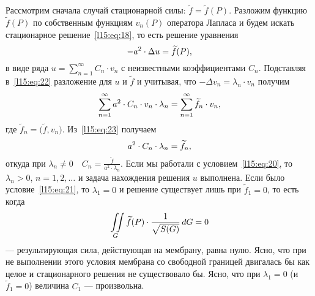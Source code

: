 \documentclass[12pt,a4paper,openany,fleqn]{book}
\theoremstyle{definition}
\begin{document}
	Рассмотрим сначала случай стационарной силы: $\widetilde{f}=\widetilde{f}(P)$. Разложим функцию $\widetilde{f}(P)$ по собственным функциям $v_n(P)$ оператора Лапласа и будем искать стационарное решение~\eqref{l15:eq:18}, то есть решение уравнения
	\begin{equation}\label{l15:eq:22}
		\hfill-a^2\cdot\Delta u=\widetilde{f}(P),\hfill
	\end{equation}
	в виде ряда $\displaystyle u=\sum\limits_{n=1}^{\infty}C_n\cdot v_n$ с неизвестными коэффициентами $C_n$. Подставляя в~\eqref{l15:eq:22} разложение для $u$ и $\widetilde{f}$ и учитывая, что $-\Delta v_n=\lambda_n\cdot v_n$ получим
	\begin{equation}\label{l15:eq:23}
		\hfill\sum\limits_{n=1}^{\infty}a^2\cdot C_n\cdot v_n\cdot\lambda_n=\sum\limits_{n=1}^{\infty}\widetilde{f}_n\cdot v_n,\hfill
	\end{equation}
	где $\widetilde{f}_n=\big(\widetilde{f},v_n\big)$. Из~\eqref{l15:eq:23} получаем
	\begin{equation*}
		\hfill a^2\cdot C_n\cdot\lambda_n=\widetilde{f}_n,\hfill
	\end{equation*}
	откуда при $\lambda_n\neq0\quad$$\displaystyle C_n=\frac{\widetilde{f}}{a^2\cdot\lambda_n}$. Если мы работали с условием~\eqref{l15:eq:20}, то $\lambda_n>0$, $n=1,2,\ldots$ и задача нахождения решения $u$ выполнена. Если было условие~\eqref{l15:eq:21}, то $\lambda_1=0$ и решение существует лишь при $\widetilde{f}_1=0$, то есть когда 
	\begin{equation*}
		\hfill\iint\limits_{G} \widetilde{f}(P)\cdot\frac{1}{\sqrt{S(G)}}\,dG=0\hfill
	\end{equation*}
	--- результирующая сила, действующая на мембрану, равна нулю. Ясно, что при не выполнении этого условия мембрана со свободной границей двигалась бы как целое и стационарного решения не существовало бы. Ясно, что при $\lambda_1=0$ (и $\widetilde{f}_1=0$) величина $C_1$ --- произвольна.  
	
\end{document}
